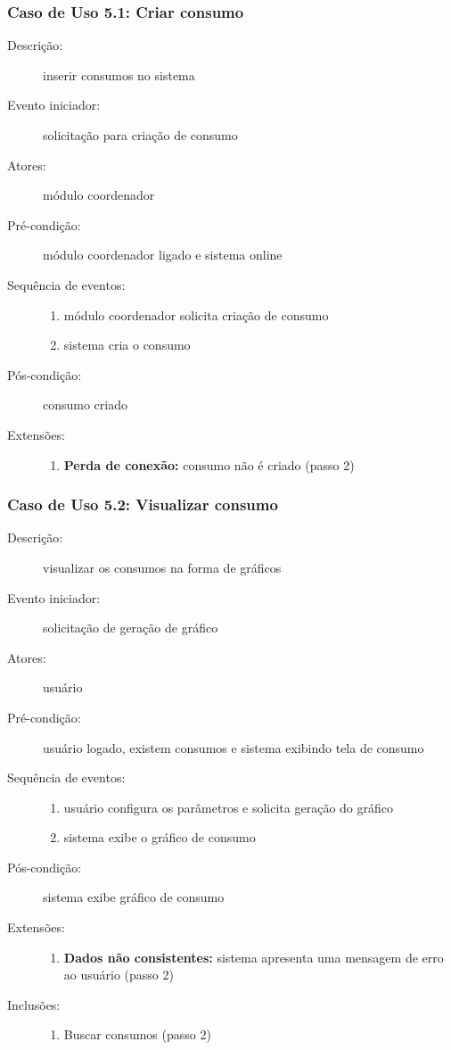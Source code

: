 \subsubsection{Caso de Uso 5.1: Criar consumo}
\begin{description}
	\item[Descrição:] inserir consumos no sistema
	\item[Evento iniciador:] solicitação para criação de consumo
	\item[Atores:] módulo coordenador
	\item[Pré-condição:] módulo coordenador ligado e sistema online
	\item[Sequência de eventos:] \hfill
		\begin{enumerate}
			\item{módulo coordenador solicita criação de consumo}
			\item{sistema cria o consumo}
		\end{enumerate}
	\item[Pós-condição:] consumo criado
	\item[Extensões:] \hfill
		\begin{enumerate}
			\item{\textbf{Perda de conexão:} consumo não é criado (passo 2)}
		\end{enumerate}
\end{description}
%
\subsubsection{Caso de Uso 5.2: Visualizar consumo}
\begin{description}
	\item[Descrição:] visualizar os consumos na forma de gráficos
	\item[Evento iniciador:] solicitação de geração de gráfico
	\item[Atores:] usuário
	\item[Pré-condição:] usuário logado, existem consumos e sistema exibindo tela de consumo
	\item[Sequência de eventos:] \hfill
		\begin{enumerate}
			\item{usuário configura os parâmetros e solicita geração do gráfico}
			\item{sistema exibe o gráfico de consumo}
		\end{enumerate}
	\item[Pós-condição:] sistema exibe gráfico de consumo
	\item[Extensões:] \hfill
		\begin{enumerate}
			\item{\textbf{Dados não consistentes:} sistema apresenta uma mensagem de erro ao usuário (passo 2)}
		\end{enumerate}
	\item[Inclusões:] \hfill
		\begin{enumerate}
			\item{Buscar consumos (passo 2)}
		\end{enumerate}
\end{description}
%
